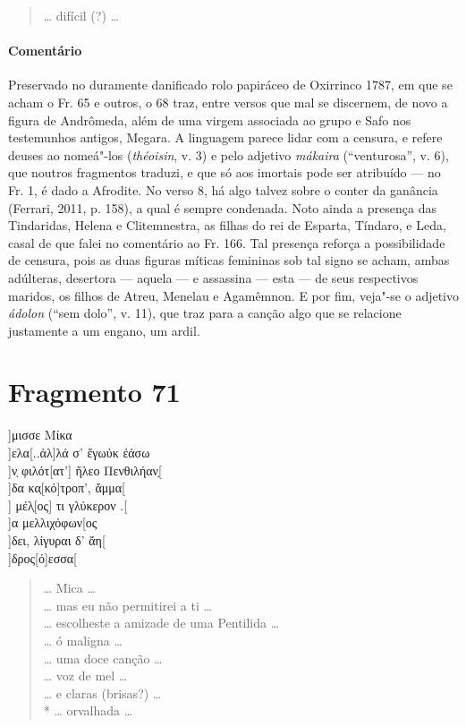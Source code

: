 {\begin{verse}
\ast\quad\ast\quad\ast

\ldots{} difícil (?) \ldots{}
\end{verse}

\pagebreak
{\paragraph{Comentário} Preservado no duramente danificado rolo papiráceo de Oxirrinco 1787, em que se acham o Fr. 65 e outros, o 68 traz, entre versos que mal se discernem, de novo a figura de Andrômeda, além de uma virgem associada ao grupo e Safo nos testemunhos antigos, Megara.  A linguagem parece lidar com a censura, e refere deuses ao nomeá"-los (\textit{théoisin}, v. 3) e pelo adjetivo \textit{mákaira} (``venturosa'', v. 6), que noutros fragmentos traduzi, e que só aos imortais pode ser atribuído --- no Fr. 1, é dado a Afrodite. No verso 8, há algo talvez sobre o conter da ganância (Ferrari, 2011, p. 158), a qual é sempre condenada. Noto ainda a presença das Tindaridas, Helena e Clitemnestra, as filhas do rei de Esparta, Tíndaro, e Leda, casal de que falei no comentário ao Fr. 166. Tal presença reforça a possibilidade de censura, pois as duas figuras míticas femininas sob tal signo se acham, ambas adúlteras, desertora --- aquela --- e assassina --- esta --- de seus respectivos maridos, os filhos de Atreu, Menelau e Agamêmnon. E por fim, veja"-se o adjetivo \textit{ádolon} (``sem dolo'', v. 11), que traz para a canção algo que se relacione justamente a um engano, um ardil.}



\pagebreak
\section{Fragmento 71}

\begin{gkverse}
]μισσε Μίκα\\
]ελα[..ἀλ]λά σ’ ἔγωὐκ ἐάσω\\
         ]ν̣ φιλότ[ατ’] ἤλεο Πενθιλήαν̣[\\
]δα κα̣[κό]τροπ’, ἄμμα[\\
    ] μέλ̣[ος] τι γλύκερον .[\\
    ]α μελλιχόφων[ος\\
    ]δει, λίγυραι δ’ ἄη[\\
        ]δρος[ό]εσσα[
\end{gkverse}

\begin{verse}
\ldots{} Mica \ldots{}\\
\ldots{} mas eu não permitirei a ti \ldots{}\\
\ldots{} escolheste a amizade de uma Pentilida \ldots{}\\
\ldots{} ó maligna \ldots{}\\
\ldots{} uma doce canção \ldots{}\\
\ldots{} voz de mel \ldots{}\\
\ldots{} e claras (brisas?) \ldots{}\\*
\ldots{} orvalhada \ldots{}
\end{verse}

}
